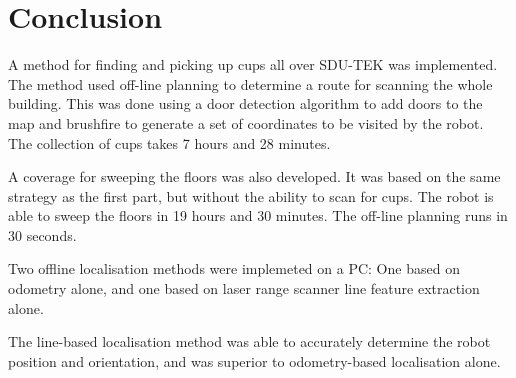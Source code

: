 \section{Conclusion}
\label{sec:conclusion}
A method for finding and picking up cups all over SDU-TEK was implemented. The method used off-line planning to determine a route for scanning the whole building. 
This was done using a door detection algorithm to add doors to the map and brushfire to generate a set of coordinates to be visited by the robot.
The collection of cups takes 7 hours and 28 minutes.

A coverage for sweeping the floors was also developed. It was based on the same strategy as the first part, but without the ability to scan for cups. The robot is able to sweep the floors in 19 hours and 30 minutes. The off-line planning runs in 30 seconds. 

Two offline localisation methods were implemeted on a PC:
One based on odometry alone, and one based on laser range scanner line feature extraction alone.

The line-based localisation method was able to accurately determine the robot position and orientation,
and was superior to odometry-based localisation alone.